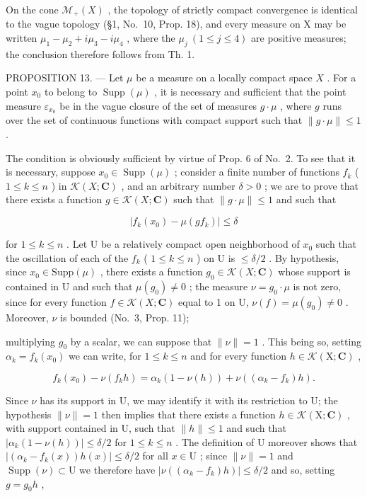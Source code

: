 On the cone \(\mathcal{M}_{+}(X)\) , the topology of strictly compact convergence is identical to the vague topology (§1, No.~10, Prop. 18), and every measure on X may be written \(\mu_{1}-\mu_{2}+i\mu_{3}-i\mu_{4}\) , where the \(\mu_{j}\ (1\leqslant j\leqslant4)\) are positive measures; the conclusion therefore follows from Th. 1.

PROPOSITION 13. --- Let \(\mu\) be a measure on a locally compact space \(X\) . For a point \(x_0\) to belong to \(\operatorname{Supp}(\mu)\) , it is necessary and sufficient that the point measure \(\varepsilon_{x_0}\) be in the vague closure of the set of measures \(g \cdot \mu\) , where \(g\) runs over the set of continuous functions with compact support such that \(\| g \cdot \mu \| \leqslant 1\) .

The condition is obviously sufficient by virtue of Prop. 6 of No.~2. To see that it is necessary, suppose \(x_0 \in \operatorname{Supp}(\mu)\) ; consider a finite number of functions \(f_k\) ( \(1 \leqslant k \leqslant n\) ) in \(\mathcal{K}(X; \mathbf{C})\) , and an arbitrary number \(\delta > 0\) ; we are to prove that there exists a function \(g \in \mathcal{K}(X; \mathbf{C})\) such that \(\| g \cdot \mu \| \leqslant 1\) and such that

\[
\left| f _ {k} \left(x _ {0}\right) - \mu \left(g f _ {k}\right) \right| \leqslant \delta
\]

for \(1 \leqslant k \leqslant n\) . Let U be a relatively compact open neighborhood of \(x_0\) such that the oscillation of each of the \(f_k\) ( \(1 \leqslant k \leqslant n\) ) on U is \(\leqslant \delta/2\) . By hypothesis, since \(x_0 \in \text{Supp}(\mu)\) , there exists a function \(g_0 \in \mathcal{K}(X; \mathbf{C})\) whose support is contained in U and such that \(\mu(g_0) \neq 0\) ; the measure \(\nu = g_0 \cdot \mu\) is not zero, since for every function \(f \in \mathcal{K}(X; \mathbf{C})\) equal to 1 on U, \(\nu(f) = \mu(g_0) \neq 0\) . Moreover, \(\nu\) is bounded (No.~3, Prop. 11);

multiplying \(g_{0}\) by a scalar, we can suppose that \(\|\nu\|=1\) . This being so, setting \(\alpha_{k}=f_{k}(x_{0})\) we can write, for \(1\leqslant k\leqslant n\) and for every function \(h\in\mathcal{K}(\mathrm{X};\mathbf{C})\) ,

\[
f _ {k} (x _ {0}) - \nu (f _ {k} h) = \alpha_ {k} (1 - \nu (h)) + \nu ((\alpha_ {k} - f _ {k}) h).
\]

Since \(\nu\) has its support in U, we may identify it with its restriction to U; the hypothesis \(\| \nu \| = 1\) then implies that there exists a function \(h \in \mathcal{K}(\mathrm{X};\mathbf{C})\) , with support contained in U, such that \(\| h \| \leqslant 1\) and such that \(|\alpha_{k}(1 - \nu (h))| \leqslant \delta / 2\) for \(1 \leqslant k \leqslant n\) . The definition of U moreover shows that \(|(\alpha_{k} - f_{k}(x))h(x)| \leqslant \delta / 2\) for all \(x \in \mathrm{U}\) ; since \(\| \nu \| = 1\) and \(\operatorname{Supp}(\nu) \subset \mathrm{U}\) we therefore have \(|\nu ((\alpha_{k} - f_{k})h)| \leqslant \delta / 2\) and so, setting \(g = g_0h\) ,

